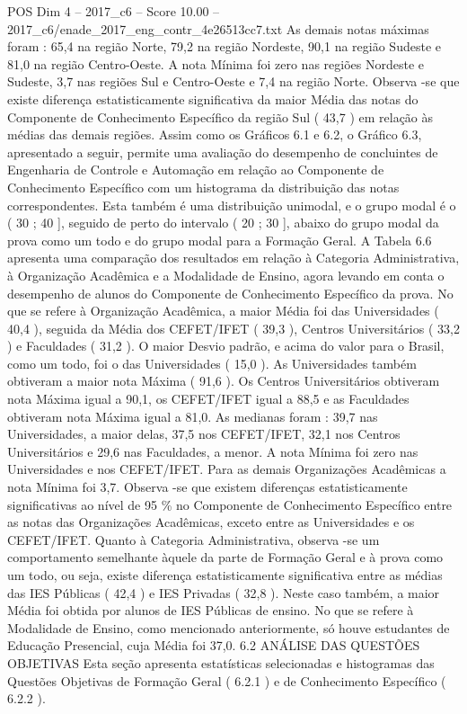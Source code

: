 \begin{textsample}{POS Dim 4 – 2017\_c6 – Score 10.00 – 2017\_c6/enade\_2017\_eng\_contr\_4e26513cc7.txt}
As demais notas máximas foram : 65,4 na região Norte, 79,2 na região Nordeste, 90,1 na região Sudeste e 81,0 na região Centro-Oeste.
A nota Mínima foi zero nas regiões Nordeste e Sudeste, 3,7 nas regiões Sul e Centro-Oeste e 7,4 na região Norte.
Observa -se que existe diferença estatisticamente significativa da maior Média das notas do Componente de Conhecimento Específico da região Sul ( 43,7 ) em relação às médias das demais regiões.
Assim como os Gráficos 6.1 e 6.2, o Gráfico 6.3, apresentado a seguir, permite uma avaliação do desempenho de concluintes de Engenharia de Controle e Automação em relação ao Componente de Conhecimento Específico com um histograma da distribuição das notas correspondentes.
Esta também é uma distribuição unimodal, e o grupo modal é o ( 30 ; 40 ], seguido de perto do intervalo ( 20 ; 30 ], abaixo do grupo modal da prova como um todo e do grupo modal para a Formação Geral.
A Tabela 6.6 apresenta uma comparação dos resultados em relação à Categoria Administrativa, à Organização Acadêmica e a Modalidade de Ensino, agora levando em conta o desempenho de alunos do Componente de Conhecimento Específico da prova.
No que se refere à Organização Acadêmica, a maior Média foi das Universidades ( 40,4 ), seguida da Média dos CEFET/IFET ( 39,3 ), Centros Universitários ( 33,2 ) e Faculdades ( 31,2 ).
O maior Desvio padrão, e acima do valor para o Brasil, como um todo, foi o das Universidades ( 15,0 ).
As Universidades também obtiveram a maior nota Máxima ( 91,6 ).
Os Centros Universitários obtiveram nota Máxima igual a 90,1, os CEFET/IFET igual a 88,5 e as Faculdades obtiveram nota Máxima igual a 81,0.
As medianas foram : 39,7 nas Universidades, a maior delas, 37,5 nos CEFET/IFET, 32,1 nos Centros Universitários e 29,6 nas Faculdades, a menor.
A nota Mínima foi zero nas Universidades e nos CEFET/IFET.
Para as demais Organizações Acadêmicas a nota Mínima foi 3,7.
Observa -se que existem diferenças estatisticamente significativas ao nível de 95 \% no Componente de Conhecimento Específico entre as notas das Organizações Acadêmicas, exceto entre as Universidades e os CEFET/IFET.
Quanto à Categoria Administrativa, observa -se um comportamento semelhante àquele da parte de Formação Geral e à prova como um todo, ou seja, existe diferença estatisticamente significativa entre as médias das IES Públicas ( 42,4 ) e IES Privadas ( 32,8 ).
Neste caso também, a maior Média foi obtida por alunos de IES Públicas de ensino.
No que se refere à Modalidade de Ensino, como mencionado anteriormente, só houve estudantes de Educação Presencial, cuja Média foi 37,0. 6.2 ANÁLISE DAS QUESTÕES OBJETIVAS Esta seção apresenta estatísticas selecionadas e histogramas das Questões Objetivas de Formação Geral ( 6.2.1 ) e de Conhecimento Específico ( 6.2.2 ).

\end{textsample}
